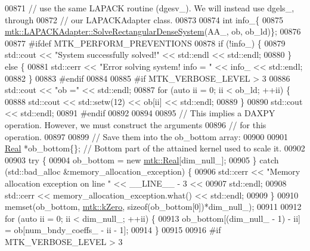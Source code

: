 \begin{DoxyCode}
{{00871     \textcolor{comment}{// use the same LAPACK routine (dgesv\_). We will instead use dgels\_, through}
00872     \textcolor{comment}{// our LAPACKAdapter class.}
00873 
00874     \textcolor{keywordtype}{int} info\_\{
00875       \hyperlink{classmtk_1_1LAPACKAdapter_a380f148ffdf96bae2f79ae28f1a6560c}{mtk::LAPACKAdapter::SolveRectangularDenseSystem}(AA\_, 
      ob, ob\_ld)\};
00876 
00877 \textcolor{preprocessor}{    #ifdef MTK\_PERFORM\_PREVENTIONS}
00878     \textcolor{keywordflow}{if} (!info\_) \{
00879       std::cout << \textcolor{stringliteral}{"System successfully solved!"} << std::endl << std::endl;
00880     \} \textcolor{keywordflow}{else} \{
00881       std::cerr << \textcolor{stringliteral}{"Error solving system! info = "} << info\_ << std::endl;
00882     \}
00883 \textcolor{preprocessor}{    #endif}
00884 
00885 \textcolor{preprocessor}{    #if MTK\_VERBOSE\_LEVEL > 3}
00886     std::cout << \textcolor{stringliteral}{"ob ="} << std::endl;
00887     \textcolor{keywordflow}{for} (\textcolor{keyword}{auto} ii = 0; ii < ob\_ld; ++ii) \{
00888       std::cout << std::setw(12) << ob[ii] << std::endl;
00889     \}
00890     std::cout << std::endl;
00891 \textcolor{preprocessor}{    #endif}
00892 
00894 
00895     \textcolor{comment}{// This implies a DAXPY operation. However, we must construct the arguments}
00896     \textcolor{comment}{// for this operation.}
00897 
00899     \textcolor{comment}{// Save them into the ob\_bottom array:}
00900 
00901     \hyperlink{group__c01-roots_gac080bbbf5cbb5502c9f00405f894857d}{Real} *ob\_bottom\{\}; \textcolor{comment}{// Bottom part of the attained kernel used to scale it.}
00902 
00903     \textcolor{keywordflow}{try} \{
00904       ob\_bottom = \textcolor{keyword}{new} \hyperlink{group__c01-roots_gac080bbbf5cbb5502c9f00405f894857d}{mtk::Real}[dim\_null\_];
00905     \} \textcolor{keywordflow}{catch} (std::bad\_alloc &memory\_allocation\_exception) \{
00906       std::cerr << \textcolor{stringliteral}{"Memory allocation exception on line "} << \_\_LINE\_\_ - 3 <<
00907         std::endl;
00908       std::cerr << memory\_allocation\_exception.what() << std::endl;
00909     \}
00910     memset(ob\_bottom, \hyperlink{group__c01-roots_ga59a451a5fae30d59649bcda274fea271}{mtk::kZero}, \textcolor{keyword}{sizeof}(ob\_bottom[0])*dim\_null\_);
00911 
00912     \textcolor{keywordflow}{for} (\textcolor{keyword}{auto} ii = 0; ii < dim\_null\_; ++ii) \{
00913       ob\_bottom[(dim\_null\_ - 1) - ii] = ob[num\_bndy\_coeffs\_ - ii - 1];
00914     \}
00915 
00916 \textcolor{preprocessor}{    #if MTK\_VERBOSE\_LEVEL > 3}
}}
\end{DoxyCode}
